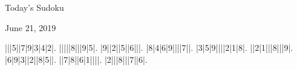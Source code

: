 \documentclass{article}
\begin{document}
\begin{center}
\Huge{Today's Sudoku}
\end{center}
\begin{center}
\Large{June 21, 2019}
\end{center}
\begin{sudoku}
|||5||7|9|3|4|2|.
|||||8|||9|5|.
|9||2||5||6|||.
|8|4|6|9||||7||.
|3|5|9||||2|1|8|.
||2|1|||8|||9|.
|6|9|3||2||8|5||.
||7|8||6|1||||.
|2|||8|||7||6|.
\end{sudoku}
\end{document}
